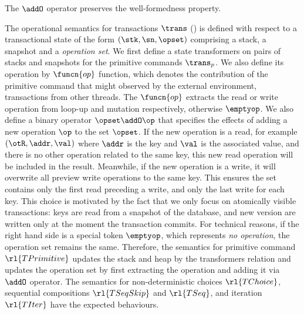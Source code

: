 \begin{lem}
The \( \addO \) operator preserves the well-formedness property.
\end{lem}

The operational semantics for transactions \(\trans\) () is defined with respect to a transactional state of the form \((\stk, \sn, \opset)\) comprising a stack, a snapshot and a \emph{operation set}.
We first define a state transformers on pairs of stacks and snapshots for the primitive commands \(\trans_{p}\).
We also define its operation by \( \funcn{op} \) function, which denotes the contribution of the primitive command that might observed by the external environment, \ie transactions from other threads.
The \( \funcn{op} \) extracts the read or write operation from loop-up and mutation respectively, otherwise \( \emptyop \).
We also define a binary operator \( \opset \addO \op \) that specifies the effects of adding a new operation \( \op \) to the set \( \opset \).
If the new operation is a read, for example \((\otR, \addr, \val)\) where \( \addr \) is the key and \( \val\) is the associated value, and there is no other operation related to the same key, this new read operation will be included in the result.
Meanwhile, if the new operation is a write, it will overwrite all preview write operations to the same key.
This ensures the set contains only the first read preceding a write, and only the last write for each key.
This choice is motivated by the fact that we only focus on atomically visible transactions: keys are read from a snapshot of the database, and new version are written only at the moment the transaction commits.
For technical reasons, if the right hand side is a special token \( \emptyop \), which represents \emph{no operation}, the operation set remains the same.
Therefore, the semantics for primitive command \(\rl{TPrimitive}\) updates the stack and heap by the transformers relation and updates the operation set by first extracting the operation and adding it via \( \addO \) operator.
The semantics for non-deterministic choices \(\rl{TChoice}\), sequential compositions \(\rl{TSeqSkip}\) and \(\rl{TSeq}\), and iteration \(\rl{TIter}\) have the expected behaviours.

